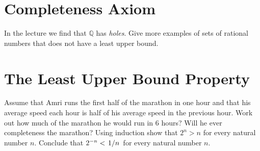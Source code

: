 \documentclass[12pt]{exam}
\begin{document}
\section{Completeness Axiom}
\begin{questions}
    \question In the lecture we find that $\mathbb{Q}$ has \textit{holes}. Give more examples of sets of rational numbers that does not have a least upper bound.
\end{questions}
\section{The Least Upper Bound Property}
\begin{questions}
    \question Assume that Amri runs the first half of the marathon in one hour and that his average speed each hour is half of his average speed in the previous hour. Work out how much of the marathon he would run in 6 hours? Will he ever completeness the marathon?  
    \question Using induction show that $2^n > n$ for every natural number $n$. Conclude that $2^{-n}<\flatfrac{1}{n}$ for every natural number $n$.
\end{questions}
\end{document}
